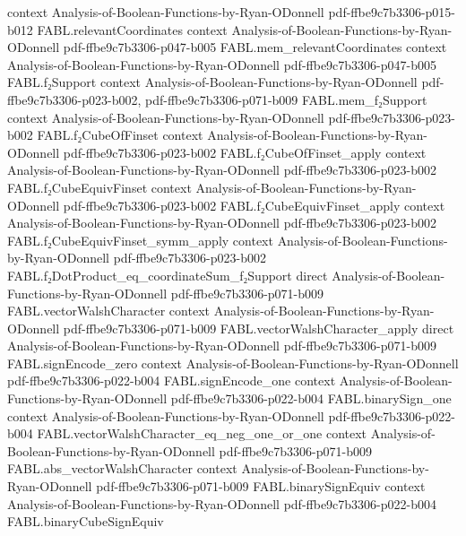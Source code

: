\begin{theorem}
  {context}
  {Analysis-of-Boolean-Functions-by-Ryan-ODonnell}
  {pdf-ffbe9c7b3306-p015-b012}
\proofstep
  {FABL.relevantCoordinates}
  {context}
  {Analysis-of-Boolean-Functions-by-Ryan-ODonnell}
  {pdf-ffbe9c7b3306-p047-b005}
\proofstep
  {FABL.mem_relevantCoordinates}
  {context}
  {Analysis-of-Boolean-Functions-by-Ryan-ODonnell}
  {pdf-ffbe9c7b3306-p047-b005}
\proofstep
  {FABL.f₂Support}
  {context}
  {Analysis-of-Boolean-Functions-by-Ryan-ODonnell}
  {pdf-ffbe9c7b3306-p023-b002,
    pdf-ffbe9c7b3306-p071-b009}
\proofstep
  {FABL.mem_f₂Support}
  {context}
  {Analysis-of-Boolean-Functions-by-Ryan-ODonnell}
  {pdf-ffbe9c7b3306-p023-b002}
\proofstep
  {FABL.f₂CubeOfFinset}
  {context}
  {Analysis-of-Boolean-Functions-by-Ryan-ODonnell}
  {pdf-ffbe9c7b3306-p023-b002}
\proofstep
  {FABL.f₂CubeOfFinset_apply}
  {context}
  {Analysis-of-Boolean-Functions-by-Ryan-ODonnell}
  {pdf-ffbe9c7b3306-p023-b002}
\proofstep
  {FABL.f₂CubeEquivFinset}
  {context}
  {Analysis-of-Boolean-Functions-by-Ryan-ODonnell}
  {pdf-ffbe9c7b3306-p023-b002}
\proofstep
  {FABL.f₂CubeEquivFinset_apply}
  {context}
  {Analysis-of-Boolean-Functions-by-Ryan-ODonnell}
  {pdf-ffbe9c7b3306-p023-b002}
\proofstep
  {FABL.f₂CubeEquivFinset_symm_apply}
  {context}
  {Analysis-of-Boolean-Functions-by-Ryan-ODonnell}
  {pdf-ffbe9c7b3306-p023-b002}
\proofstep
  {FABL.f₂DotProduct_eq_coordinateSum_f₂Support}
  {direct}
  {Analysis-of-Boolean-Functions-by-Ryan-ODonnell}
  {pdf-ffbe9c7b3306-p071-b009}
\proofstep
  {FABL.vectorWalshCharacter}
  {context}
  {Analysis-of-Boolean-Functions-by-Ryan-ODonnell}
  {pdf-ffbe9c7b3306-p071-b009}
\proofstep
  {FABL.vectorWalshCharacter_apply}
  {direct}
  {Analysis-of-Boolean-Functions-by-Ryan-ODonnell}
  {pdf-ffbe9c7b3306-p071-b009}
\proofstep
  {FABL.signEncode_zero}
  {context}
  {Analysis-of-Boolean-Functions-by-Ryan-ODonnell}
  {pdf-ffbe9c7b3306-p022-b004}
\proofstep
  {FABL.signEncode_one}
  {context}
  {Analysis-of-Boolean-Functions-by-Ryan-ODonnell}
  {pdf-ffbe9c7b3306-p022-b004}
\proofstep
  {FABL.binarySign_one}
  {context}
  {Analysis-of-Boolean-Functions-by-Ryan-ODonnell}
  {pdf-ffbe9c7b3306-p022-b004}
\proofstep
  {FABL.vectorWalshCharacter_eq_neg_one_or_one}
  {context}
  {Analysis-of-Boolean-Functions-by-Ryan-ODonnell}
  {pdf-ffbe9c7b3306-p071-b009}
\proofstep
  {FABL.abs_vectorWalshCharacter}
  {context}
  {Analysis-of-Boolean-Functions-by-Ryan-ODonnell}
  {pdf-ffbe9c7b3306-p071-b009}
\proofstep
  {FABL.binarySignEquiv}
  {context}
  {Analysis-of-Boolean-Functions-by-Ryan-ODonnell}
  {pdf-ffbe9c7b3306-p022-b004}
\proofstep
  {FABL.binaryCubeSignEquiv}

\end{theorem}
